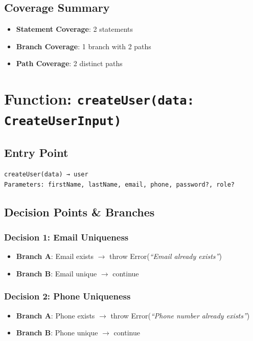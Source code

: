 \subsection{Coverage Summary}
\begin{itemize}
    \item \textbf{Statement Coverage}: 2 statements
    \item \textbf{Branch Coverage}: 1 branch with 2 paths
    \item \textbf{Path Coverage}: 2 distinct paths
\end{itemize}

\section{Function: \texttt{createUser(data: CreateUserInput)}}

\subsection{Entry Point}
\begin{verbatim}
createUser(data) → user
Parameters: firstName, lastName, email, phone, password?, role?
\end{verbatim}

\subsection{Decision Points \& Branches}

\subsubsection{Decision 1: Email Uniqueness}
\begin{itemize}
    \item \textbf{Branch A}: Email exists $\rightarrow$ throw Error(\textit{``Email already exists''})
    \item \textbf{Branch B}: Email unique $\rightarrow$ continue
\end{itemize}

\subsubsection{Decision 2: Phone Uniqueness}
\begin{itemize}
    \item \textbf{Branch A}: Phone exists $\rightarrow$ throw Error(\textit{``Phone number already exists''})
    \item \textbf{Branch B}: Phone unique $\rightarrow$ continue
\end{itemize}

